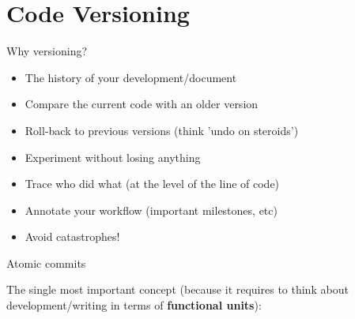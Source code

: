 \documentclass[compress]{beamer}
\begin{document}
\section{Code Versioning}

\begin{frame}[label=codeversioning]{Why versioning?}

    \begin{itemize}
        \item The history of your development/document
        \item Compare the current code with an older version
        \item Roll-back to previous versions (think 'undo on steroids')
        \item Experiment without losing anything
        \item Trace who did what (at the level of the line of code)
        \item Annotate your workflow (important milestones, etc)
        \item Avoid catastrophes!
    \end{itemize}
\end{frame}

\begin{frame}{Atomic commits}

    The single most important concept (because it requires to think about
    development/writing in terms of {\bf functional units}):



\end{frame}
\end{document}
